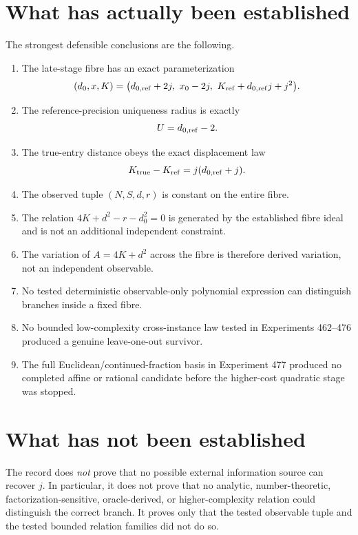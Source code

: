 \documentclass[11pt,a4paper]{article}
\begin{document}
\section{What has actually been established}

The strongest defensible conclusions are the following.

\begin{enumerate}[leftmargin=*]
\item The late-stage fibre has an exact parameterization
\begin{equation}
(d_0,x,K)=\bigl(d_{0,\rm ref}+2j,\ x_0-2j,\ K_{\rm ref}+d_{0,\rm ref}j+j^2\bigr).
\end{equation}
\item The reference-precision uniqueness radius is exactly
\begin{equation}
U=d_{0,\rm ref}-2.
\end{equation}
\item The true-entry distance obeys the exact displacement law
\begin{equation}
K_{\rm true}-K_{\rm ref}=j(d_{0,\rm ref}+j).
\end{equation}
\item The observed tuple $(N,S,d,r)$ is constant on the entire fibre.
\item The relation $4K+d^2-r-d_0^2=0$ is generated by the established fibre ideal and is not an additional independent constraint.
\item The variation of $A=4K+d^2$ across the fibre is therefore derived variation, not an independent observable.
\item No tested deterministic observable-only polynomial expression can distinguish branches inside a fixed fibre.
\item No bounded low-complexity cross-instance law tested in Experiments 462--476 produced a genuine leave-one-out survivor.
\item The full Euclidean/continued-fraction basis in Experiment 477 produced no completed affine or rational candidate before the higher-cost quadratic stage was stopped.
\end{enumerate}

\section{What has not been established}

The record does \emph{not} prove that no possible external information source can recover $j$. In particular, it does not prove that no analytic, number-theoretic, factorization-sensitive, oracle-derived, or higher-complexity relation could distinguish the correct branch. It proves only that the tested observable tuple and the tested bounded relation families did not do so.
\end{document}
